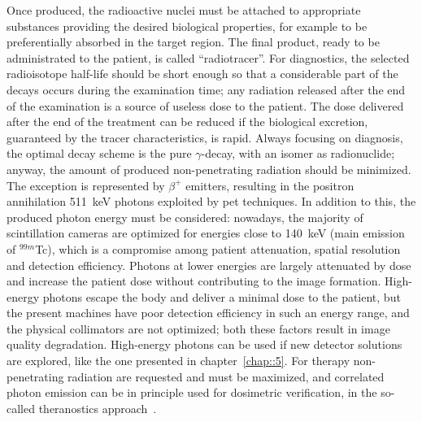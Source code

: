 Once produced, the radioactive nuclei must be attached  to appropriate substances providing the desired biological properties, for example to be preferentially absorbed in the target region. The final product, ready to be administrated to the patient, is called \enquote{radiotracer}. 
For diagnostics, the selected radioisotope half-life should be short enough so that a considerable part of the decays occurs during the examination time; any radiation released after the end of the examination is a source of useless dose to the patient. The dose delivered after the end of the treatment can be reduced if the biological excretion, guaranteed by the tracer characteristics, is rapid. Always focusing on diagnosis, the optimal decay scheme is the pure $\gamma$-decay, with an isomer as radionuclide; anyway, the amount of produced non-penetrating radiation should be minimized. The exception is represented by $\beta^+$ emitters, resulting in the positron annihilation 511~keV photons exploited by \gls{pet} techniques. In addition to this, the produced photon energy must be considered: nowadays, the majority of scintillation cameras are optimized for energies close to 140~keV (main emission of $^{99m}$Tc), which is a compromise among patient attenuation, spatial resolution and detection efficiency. Photons at lower energies are largely attenuated by dose and increase the patient dose without contributing to the image formation. High-energy photons escape the body and deliver a minimal dose to the patient, but the present machines have poor detection efficiency in such an energy range, and the physical collimators are not optimized; both these factors result in image quality degradation. High-energy photons can be used if new detector solutions are explored, like the one presented in chapter~\ref{chap::5}. 
For therapy non-penetrating radiation are requested and must be maximized, and correlated photon emission can be in principle used for dosimetric verification, in the so-called theranostics approach~\parencite{Yordanova2017}. 
